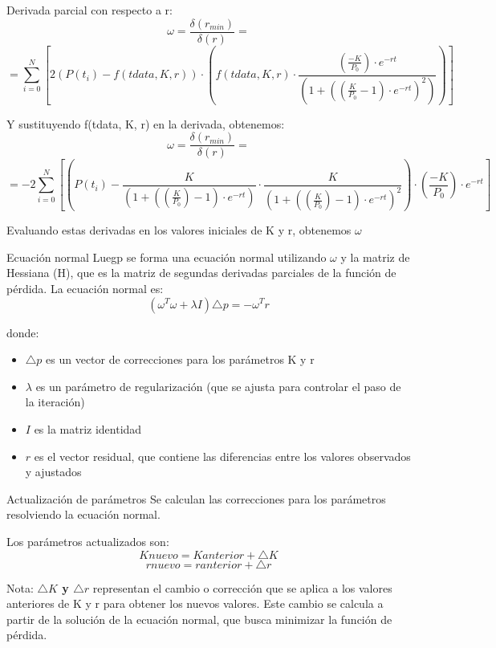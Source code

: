 \documentclass{beamer}
\begin{document}
\begin{frame}  
\begin{block}{Derivada parcial con respecto a r:}
$$\omega = \frac{\delta(r_{min})}{\delta(r)} = $$ 
\small{$$=\sum_{i=0}^{N}[2(P(t_{i}) - f(tdata, K, r)) \cdot (f(tdata, K, r) \cdot \frac{(\frac{-K}{P_{0}}) \cdot e^{-rt}}{(1 + ((\frac{K}{P_{0}} - 1) \cdot e^{-rt})^{2})})]$$}
\end{block}
\begin{block}{Y sustituyendo  f(tdata, K, r) en la derivada, obtenemos:}
$$\omega = \frac{\delta(r_{min})}{\delta(r)} = $$
\small{$$= -2\sum_{i=0}^{N}[(P(t_{i}) - \frac{K}{(1 + ((\frac{K}{P_{0}}) - 1) \cdot e^{-rt})} \cdot \frac{K}{(1 + ((\frac{K}{P_{0}}) - 1) \cdot e^{-rt})^{2}}) \cdot (\frac{-K}{P_{0}}) \cdot e^{-rt}]$$}
\end{block}
Evaluando estas derivadas en los valores iniciales de K y r, obtenemos $\omega$
\end{frame}

\begin{frame}{Ecuación normal}
    Luegp se forma una ecuación normal utilizando $\omega$ y la matriz de Hessiana (H), que es la matriz de segundas derivadas parciales de la función de pérdida. La ecuación normal es:
    $$(\omega^{T}\omega + \lambda I)\triangle p = -\omega^{T} r$$
    \begin{block}{donde:}
        \begin{itemize}
            \item $\triangle p$ es un vector de correcciones para los parámetros K y r
            \item $\lambda$ es un parámetro de regularización (que se ajusta para controlar el paso de la iteración)
            \item $I$ es la matriz identidad
            \item $r$ es el vector residual, que contiene las diferencias entre los valores observados y ajustados
        \end{itemize}
    \end{block}
\end{frame}

\begin{frame}{Actualización de parámetros}
Se calculan las correcciones para los parámetros resolviendo la ecuación normal. 
\begin{block}{Los parámetros actualizados son:}
$$Knuevo = Kanterior + \triangle K$$
$$rnuevo = ranterior + \triangle r$$
\end{block}
Nota: \textbf{$\triangle K$ y $\triangle r$} representan el cambio o corrección que se aplica a los valores anteriores de K y r para obtener los nuevos valores. Este cambio se calcula a partir de la solución de la ecuación normal, que busca minimizar la función de pérdida.
\end{frame}
\end{document}
